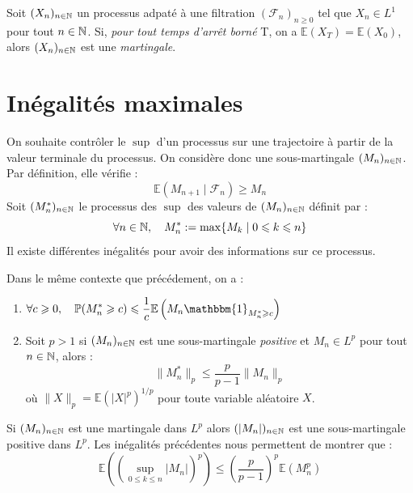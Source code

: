 \begin{theorem}
    Soit $(X_n)_{n \in \mathbb{N}}$ un processus adpaté à une filtration $( \mathcal{F}_n)_{n \geqslant 0}$ 
    tel que $ X_n \in L^1$ pour tout $n \in \mathbb{N}$. Si, \emph{pour tout temps d'arrêt borné} T, on 
    a $ \mathbb{E}(X_T) = \mathbb{E}(X_0)$, alors $(X_n)_{n \in \mathbb{N}}$ est une \emph{martingale}.
\end{theorem}

\section{Inégalités maximales}

On souhaite contrôler le $\sup$ d'un processus sur une trajectoire 
à partir de la valeur terminale du processus.
On considère donc une sous-martingale $(M_n)_{n \in \mathbb{N}}$. Par définition, 
elle vérifie : 
    $$ \mathbb{E}(M_{n+1} \mid \mathcal{F}_n) \geqslant M_n $$ 
Soit $(M_n^*)_{n \in \mathbb{N}}$ le processus des $\sup$ des valeurs de $(M_n)_{n \in \mathbb{N}}$ 
définit par : 
    $$ \forall n \in \mathbb{N}, \quad M_n^* := \max \{M_k \mid 0 \leqslant k \leqslant n\} $$ 
Il existe différentes inégalités pour avoir des informations sur ce processus. 

\begin{proposition}
    Dans le même contexte que précédement, on a : 
    \begin{enumerate}[label=\roman*)]
        \item $ {\displaystyle \forall c \geqslant 0, \quad \myP(M_n^* \geqslant c) \leqslant \frac{1}{c} \mathbb{E} \left( M_n \mathbbm{1}_{M_n^* \geqslant c} \right)} $
        \item Soit $p > 1$ si $(M_n)_{n \in \mathbb{N}}$ est une sous-martingale \emph{positive} et $ M_n \in L^p$ 
        pour tout $n \in \mathbb{N}$, alors : 
            \begin{equation}
                \| M_n^* \|_p \leqslant \frac{p}{p-1} \| M_n\|_p 
            \end{equation}
        où $ \| X \|_p = \mathbb{E}(|X|^p )^{1/p}$ pour toute variable aléatoire $X$.
    \end{enumerate}
\end{proposition}

\begin{remark}
    Si $(M_n)_{n \in \mathbb{N}}$ est une martingale dans $L^p$ alors $ (|M_n|)_{n \in \mathbb{N}}$ 
    est une sous-martingale positive dans $L^p$. Les inégalités précédentes nous permettent 
    de montrer que : 
        $$ \mathbb{E} \left( \left( \sup_{0 \leqslant k \leqslant n} |M_n| \right)^p \right) \leqslant \left( \frac{p}{p-1}\right)^p \mathbb{E}(M_n^p) $$ 
\end{remark}

